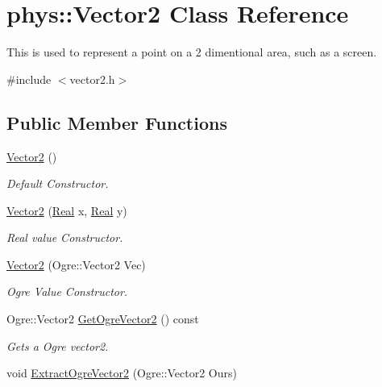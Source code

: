 \hypertarget{classphys_1_1Vector2}{
\section{phys::Vector2 Class Reference}
\label{d0/d2c/classphys_1_1Vector2}
}


This is used to represent a point on a 2 dimentional area, such as a screen.  




{\ttfamily \#include $<$vector2.h$>$}

\subsection*{Public Member Functions}
\begin{DoxyCompactItemize}
\item 
\hyperlink{classphys_1_1Vector2_a1e9c6000e5acd162a49836414a27bac7}{Vector2} ()
\begin{DoxyCompactList}\small\item\em Default Constructor. \item\end{DoxyCompactList}\item 
\hyperlink{classphys_1_1Vector2_ae8d3c95a5a60d12e706739cbadf01ffb}{Vector2} (\hyperlink{namespacephys_af7eb897198d265b8e868f45240230d5f}{Real} x, \hyperlink{namespacephys_af7eb897198d265b8e868f45240230d5f}{Real} y)
\begin{DoxyCompactList}\small\item\em Real value Constructor. \item\end{DoxyCompactList}\item 
\hyperlink{classphys_1_1Vector2_af3dbb91ef994e19b68c84e4e26eafac3}{Vector2} (Ogre::Vector2 Vec)
\begin{DoxyCompactList}\small\item\em Ogre Value Constructor. \item\end{DoxyCompactList}\item 
Ogre::Vector2 \hyperlink{classphys_1_1Vector2_adc6efedbdfdca596b719decc87ee2e4b}{GetOgreVector2} () const 
\begin{DoxyCompactList}\small\item\em Gets a Ogre vector2. \item\end{DoxyCompactList}\item 
void \hyperlink{classphys_1_1Vector2_af12824b786ce4b91443b5dbd700dfd58}{ExtractOgreVector2} (Ogre::Vector2 Ours)

\end{DoxyCompactItemize}
